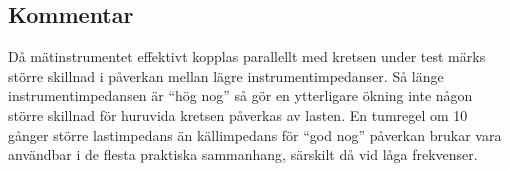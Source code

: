 \subsection{Kommentar}\label{}
Då mätinstrumentet effektivt kopplas parallellt med kretsen under test märks
större skillnad i påverkan mellan lägre instrumentimpedanser. Så länge
instrumentimpedansen är ``hög nog'' så gör en ytterligare ökning inte någon
större skillnad för huruvida kretsen påverkas av lasten. En tumregel om 10
gånger större lastimpedans än källimpedans för ``god nog'' påverkan brukar vara
användbar i de flesta praktiska sammanhang, särskilt då vid låga frekvenser.



